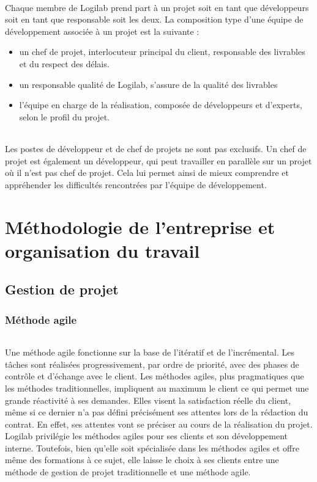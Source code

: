 \documentclass {report}
\begin{document}
\paragraph{}
Chaque membre de Logilab prend part à un projet soit en tant que développeurs soit en tant que responsable soit les deux. La composition type d'une équipe de développement associée à un projet est la suivante : 
\begin{itemize}
\item un chef de projet, interlocuteur principal du client, responsable des livrables et du respect des délais.
\item un responsable qualité de Logilab, s’assure de la qualité des livrables
\item l’équipe en charge de la réalisation, composée de développeurs et d’experts, selon le profil du projet.
\end{itemize}

\paragraph{}
Les postes de développeur et de chef de projets ne sont pas exclusifs. Un chef de projet est également un développeur, qui peut travailler en parallèle sur un projet où il n’est pas chef de projet. Cela lui permet ainsi de mieux comprendre et appréhender les difficultés rencontrées par l'équipe de développement.





\part{Méthodologie de l'entreprise et organisation du travail}
\chapter{Gestion de projet}
\section{Méthode agile}
\paragraph{}
Une méthode agile fonctionne sur la base de l'itératif et de l’incrémental. Les tâches sont réalisées progressivement, par ordre de priorité, avec des  phases de contrôle et d’échange avec le client. Les méthodes agiles, plus pragmatiques que les méthodes traditionnelles,  impliquent au maximum le client ce qui permet une grande réactivité à ses demandes. Elles visent la satisfaction réelle du client, même si ce dernier n'a pas défini précisément ses attentes lors de la rédaction du contrat. En effet, ses attentes vont se préciser au cours de la réalisation du projet. Logilab privilégie les méthodes agiles pour ses clients et son développement interne. Toutefois, bien qu'elle soit spécialisée dans les méthodes agiles et offre même des formations à ce sujet, elle laisse le choix à ses clients entre une méthode de gestion de projet traditionnelle et une méthode agile. 
\end{document}
